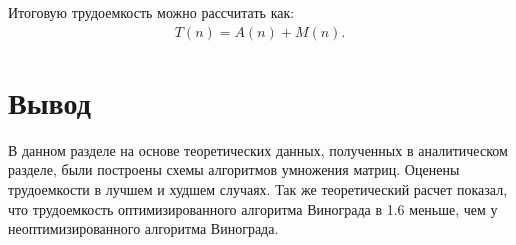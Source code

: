 Итоговую трудоемкость можно рассчитать как:
\begin{equation}
	\begin{gathered}
		T(n) = A(n) + M(n).
	\end{gathered}
\end{equation}

\section*{Вывод}
В данном разделе на основе теоретических данных, полученных в аналитическом разделе, были построены схемы алгоритмов умножения матриц. Оценены трудоемкости в лучшем и худшем случаях. 
Так же теоретический расчет показал, что трудоемкость оптимизированного алгоритма Винограда в 1.6 меньше, чем у неоптимизированного алгоритма Винограда.